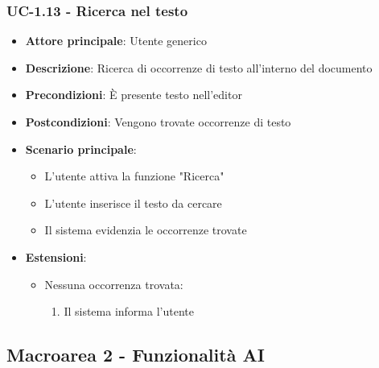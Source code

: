 \documentclass[11pt,a4paper]{article}
\begin{document}
\subsubsection{UC-1.13 - Ricerca nel testo}
\begin{itemize}
    \item \textbf{Attore principale}: Utente generico
    \item \textbf{Descrizione}: Ricerca di occorrenze di testo all'interno del documento
    \item \textbf{Precondizioni}: È presente testo nell'editor
    \item \textbf{Postcondizioni}: Vengono trovate occorrenze di testo
    \item \textbf{Scenario principale}:
        \begin{itemize}
            \item L'utente attiva la funzione "Ricerca"
            \item L'utente inserisce il testo da cercare
            \item Il sistema evidenzia le occorrenze trovate
        \end{itemize}
    \item \textbf{Estensioni}:
        \begin{itemize}
            \item Nessuna occorrenza trovata:
                \begin{enumerate}
                    \item Il sistema informa l'utente
                \end{enumerate}
        \end{itemize}
\end{itemize}


\newpage

\subsection{Macroarea 2 - Funzionalità AI}
\end{document}
